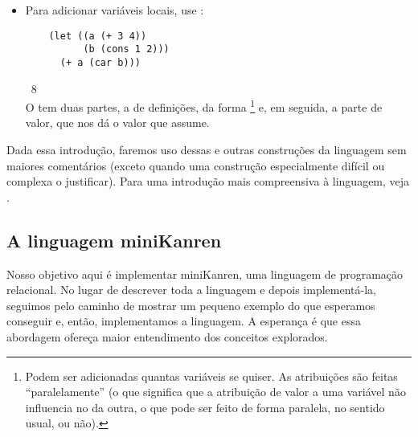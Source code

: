\documentclass{article}
\begin{document}
\begin{itemize}
  Podem ser adicionadas quantas cláusulas do tipo
   se quiser (vale notar, elas são
  avaliadas sequencialmente), sendo que a última pode
  opcionalmente ser como , ou .

\item Para adicionar variáveis locais, use :
  \begin{lstlisting}
    (let ((a (+ 3 4))
          (b (cons 1 2)))
      (+ a (car b)))
  \end{lstlisting}
  \hspace{1cm} \seta\ 8\\
  O  tem duas partes, a de definições, da forma
  \footnote{Podem ser adicionadas quantas variáveis se
    quiser. As atribuições são feitas ``paralelamente'' (o que
    significa que a atribuição de valor a uma variável não influencia no
    da outra, o que pode ser feito de forma paralela, no sentido usual, ou não).}
  e, em seguida, a parte de valor, que nos dá o valor que 
  assume.
\end{itemize}


  

  Dada essa introdução, faremos uso dessas e outras construções da
  linguagem sem maiores comentários (exceto quando uma construção
  especialmente difícil ou complexa o justificar). Para uma introdução
  mais compreensiva à linguagem, veja \cite{kent}.

  \subsection{A linguagem miniKanren}

  Nosso objetivo aqui é implementar miniKanren, uma linguagem de
  programação relacional. No lugar de descrever toda a linguagem e
  depois implementá-la, seguimos pelo caminho de mostrar um pequeno
  exemplo do que esperamos conseguir e, então, implementamos a
  linguagem. A esperança é que essa abordagem ofereça maior
  entendimento dos conceitos explorados.
\end{document}
